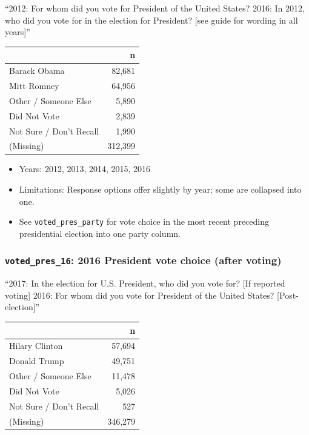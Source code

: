 \documentclass[10pt,article,oneside]{memoir}
\theoremstyle{definition}
\begin{document}
``2012: For whom did you vote for President of the United States? 2016:
In 2012, who did you vote for in the election for President? {[}see
guide for wording in all years{]}''

\begin{table}[H]
\centering
\begin{tabular}{lr}
\toprule
 & n\\
\midrule
Barack Obama & 82,681\\
Mitt Romney & 64,956\\
Other / Someone Else & 5,890\\
Did Not Vote & 2,839\\
Not Sure / Don't Recall & 1,990\\
(Missing) & 312,399\\
\bottomrule
\end{tabular}
\end{table}

\begin{itemize}
\tightlist
\item
  Years: 2012, 2013, 2014, 2015, 2016
\item
  Limitations: Response options offer slightly by year; some are
  collapsed into one.
\item
  See \texttt{voted\_pres\_party} for vote choice in the most recent
  preceding presidential election into one party column.
\end{itemize}

\hypertarget{voted_pres_16-2016-president-vote-choice-after-voting}{%
\subsubsection{\texorpdfstring{\texttt{voted\_pres\_16}: 2016 President
vote choice (after
voting)}{voted\_pres\_16: 2016 President vote choice (after voting)}}\label{voted_pres_16-2016-president-vote-choice-after-voting}}

``2017: In the election for U.S. President, who did you vote for? {[}If
reported voting{]} 2016: For whom did you vote for President of the
United States? {[}Post-election{]}''

\begin{table}[H]
\centering
\begin{tabular}{lr}
\toprule
 & n\\
\midrule
Hilary Clinton & 57,694\\
Donald Trump & 49,751\\
Other / Someone Else & 11,478\\
Did Not Vote & 5,026\\
Not Sure / Don't Recall & 527\\
(Missing) & 346,279\\
\bottomrule
\end{tabular}
\end{table}
\end{document}
